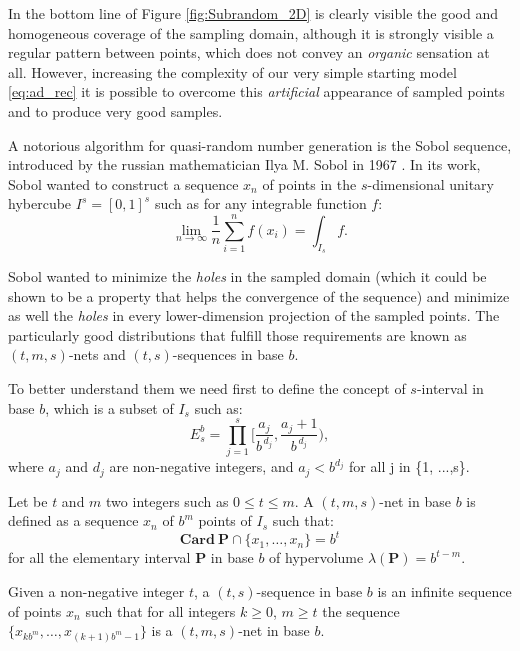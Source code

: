     In the bottom line of Figure \ref{fig:Subrandom_2D} is clearly visible the good and homogeneous coverage of the sampling domain, although it is strongly visible a regular pattern between points, which does not convey an \textit{organic} sensation at all. However, increasing the complexity of our very simple starting model \ref{eq:ad_rec} it is possible to overcome this \textit{artificial} appearance of sampled points and to produce very good samples.

    A notorious algorithm for quasi-random number generation is the Sobol sequence, introduced by the russian mathematician Ilya M. Sobol in 1967 \cite{SOBOL2001271}. In its work, Sobol wanted to construct a sequence $x_n$ of points in the $s$-dimensional unitary hybercube $I^s = [0,1]^s$ such as for any integrable function $f$:
    \begin{equation}
        \lim_{n\to\infty} \frac{1}{n} \sum_{i=1}^{n} f(x_i) = \int_{I_s} f.
    \end{equation}

    Sobol wanted to minimize the \textit{holes} in the sampled domain (which it could be shown to be a property that helps the convergence of the sequence) and minimize as well the \textit{holes} in every lower-dimension projection of the sampled points. The particularly good distributions that fulfill those requirements are known as $(t,m,s)$-nets and $(t,s)$-sequences in base $b$.

    To better understand them we need first to define the concept of $s$-interval in base $b$, which is a subset of $I_s$ such as:
    \begin{equation}
        E_s^b = \prod_{j=1}^{s} \Bigg[ \frac{a_j}{b^{\,d_j}}, \frac{a_j + 1}{b^{\,d_j}}\Bigg),
    \end{equation}
    where $a_j$ and $d_j$ are non-negative integers, and $a_j < b^{d_j}$ for all j in \{1, ...,s\}.

    Let be $t$ and $m$ two integers such as $0 \leq t \leq m$. A $(t,m,s)$-net in base $b$ is defined as a sequence $x_n$ of $b^m$ points of $I_s$ such that:
    \begin{equation}
        \mathbf{Card} \ \mathbf{P} \cap \{x_1, \dots, x_n \} = b^t
    \end{equation}
    for all the elementary  interval $\mathbf{P}$ in base $b$ of hypervolume $\lambda(\mathbf{P}) =  b^{t-m}$.

    Given a non-negative integer $t$, a $(t,s)$-sequence in base $b$ is an infinite sequence of points $x_n$ such that for all integers $k \geq 0$, $m \geq t$ the sequence $ \{ x_{kb^m}, \dots, x_{(k+1)b^m-1} \}$ is a $(t,m,s)$-net in base $b$.

